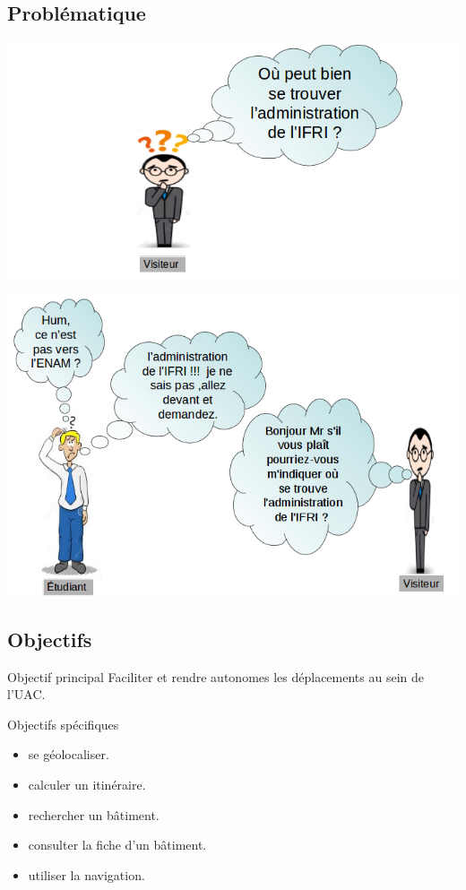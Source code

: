\documentclass[11pt,handout]{beamer}
\begin{document}
		\subsection{Problématique}
			\begin{frame}
			    \includegraphics[scale=0.5]{images/problematique_1.png}
			\end{frame}
			\begin{frame}
			    \includegraphics[scale=0.45]{images/preuve_2.png}
			\end{frame}
		\subsection{Objectifs}
			\begin{frame}
			\begin{exampleblock}{Objectif principal}
			      Faciliter et rendre autonomes les déplacements au sein de l'UAC.
			\end{exampleblock}
			  \begin{exampleblock}{Objectifs spécifiques}
			    \begin{itemize}
			     \item se géolocaliser.
			     \item calculer un itinéraire.
			     \item rechercher un bâtiment.
			     \item consulter la fiche d'un bâtiment.
			     \item utiliser la navigation.
			    \end{itemize}
			  \end{exampleblock}
			\end{frame}
\end{document}
